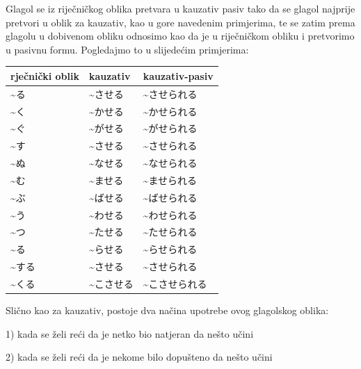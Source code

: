 	Glagol se iz riječničkog oblika pretvara u kauzativ pasiv tako da se glagol najprije pretvori u oblik za kauzativ, kao u gore navedenim primjerima, te se zatim prema glagolu u dobivenom obliku odnosimo kao da je u riječničkom obliku i pretvorimo u pasivnu formu. Pogledajmo to u slijedećim primjerima:
		
	\begin{table}[h]
		\centering
		\begin{tabular}{l l l}\toprule[2pt]
			rječnički oblik & kauzativ & kauzativ-pasiv\\
			\midrule
			\textasciitilde る & \textasciitilde させる & \textasciitilde させられる\\
			\textasciitilde く & \textasciitilde かせる & \textasciitilde かせられる\\
			\textasciitilde ぐ & \textasciitilde がせる & \textasciitilde がせられる\\
			\textasciitilde す & \textasciitilde させる & \textasciitilde させられる\\
			\textasciitilde ぬ & \textasciitilde なせる & \textasciitilde なせられる\\
			\textasciitilde む & \textasciitilde ませる & \textasciitilde ませられる\\
			\textasciitilde ぶ & \textasciitilde ばせる & \textasciitilde ばせられる\\
			\textasciitilde う & \textasciitilde わせる & \textasciitilde わせられる\\
			\textasciitilde つ & \textasciitilde たせる & \textasciitilde たせられる\\
			\textasciitilde る & \textasciitilde らせる & \textasciitilde らせられる\\
			\textasciitilde する　& \textasciitilde させる & \textasciitilde させられる\\
			\textasciitilde くる　&\textasciitilde こさせる & \textasciitilde こさせられる\\
			\bottomrule[2pt]
		\end{tabular}
	\end{table}
	

	Slično kao za kauzativ, postoje dva načina upotrebe ovog glagolskog oblika:
	
	1) kada se želi reći da je netko bio natjeran da nešto učini
	
	2) kada se želi reći da je nekome bilo dopušteno da nešto učini
 
	\begin{reibun}
	\end{reibun}

